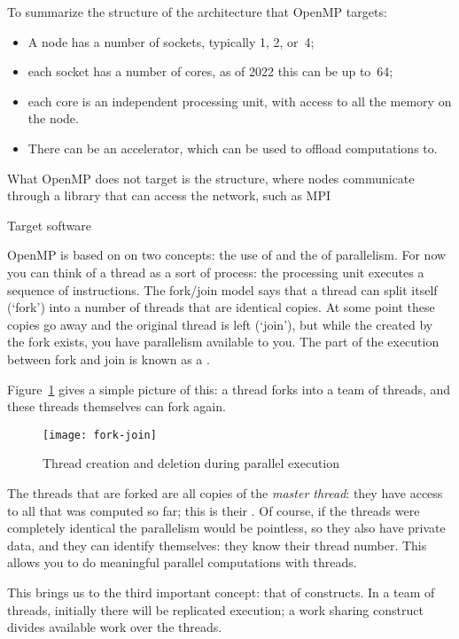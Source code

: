 To summarize the structure of the architecture that OpenMP targets:
\begin{itemize}
\item A node has a number of sockets, typically 1, 2, or~4;
\item each socket has a number of cores, as of 2022 this can be up to~64;
\item each core is an independent processing unit, with access to all
  the memory on the node.
\item There can be an accelerator, which can be used to offload computations to.
\end{itemize}
What OpenMP does not target is the  structure,
where nodes communicate through a library that can access the network,
such as \ac{MPI}

 {Target software}

OpenMP is based on on two concepts: the use of 
and the  of
parallelism. For now you can think of a thread as a sort of process:
the processing unit executes a sequence of instructions.
The fork/join model says that a thread can split itself (`fork')
into a number of threads that are identical copies. At some point
these copies go away and the original thread is left (`join'),
but while the  created by the fork exists,
you have parallelism available to you. The part of the execution
between fork and join is known as a .

Figure~\ref{fig:forkjoin} gives a simple picture of this:
a thread forks into a team of threads, and these threads
themselves can fork again.
\begin{figure}[ht]
\texttt{[image: fork-join]}
\caption{Thread creation and deletion during parallel execution}
\label{fig:forkjoin}
\end{figure}

The threads that are forked are all copies of the
\emph{master thread}: they have access to all that was
computed so far; this is their .  Of course, if
the threads were completely identical the parallelism would be
pointless, so they also have private data, and they can identify
themselves: they know their thread number.  This allows you to do
meaningful parallel computations with threads.

This brings us to the third important concept: that of 
constructs. In a team of threads, initially there will be replicated execution;
a work sharing construct divides available work over the threads.

